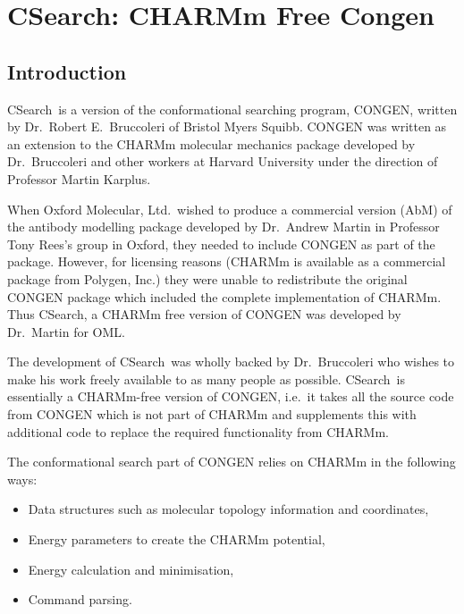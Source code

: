 \documentclass{report}
\newcommand{\cs}{CSearch}
\newcommand{\abm}{AbM}
\begin{document}
\chapter{CSearch: CHARMm Free Congen}

\section{Introduction}
\cs\ is a version of the conformational searching program, CONGEN, 
written by Dr.\ Robert E.\ Bruccoleri of Bristol Myers 
Squibb\cite{bruc:congen}.
CONGEN was written as an extension to the CHARMm molecular mechanics
package\cite{brooks:charmm} developed by Dr.\ Bruccoleri and other 
workers at Harvard
University under the direction of Professor Martin Karplus.

When Oxford Molecular, Ltd.\ wished to produce a commercial version (\abm)
of the antibody modelling package\cite{martin:loops,martin:thesis}
developed by Dr.\ Andrew Martin
in Professor Tony Rees's group in Oxford, they needed to include
CONGEN as part of the package. However, for licensing reasons
(CHARMm is available as a commercial package from Polygen, Inc.)
they were unable to redistribute the original CONGEN package which
included the complete implementation of CHARMm. Thus \cs, a CHARMm
free version of CONGEN was developed by Dr.\ Martin for OML.

The development of \cs\ was wholly backed by Dr.\ Bruccoleri who
wishes to make his work freely available to as many people as
possible. \cs\ is essentially a CHARMm-free version of CONGEN,
i.e.\ it takes all the source code from CONGEN which is not
part of CHARMm and supplements this with additional code to replace
the required functionality from CHARMm.

The conformational search part of CONGEN relies on CHARMm in the
following ways:
\begin{itemize}
\item Data structures such as molecular topology information and
coordinates,
\item Energy parameters to create the CHARMm potential,
\item Energy calculation and minimisation,
\item Command parsing.
\end{itemize}
\end{document}
